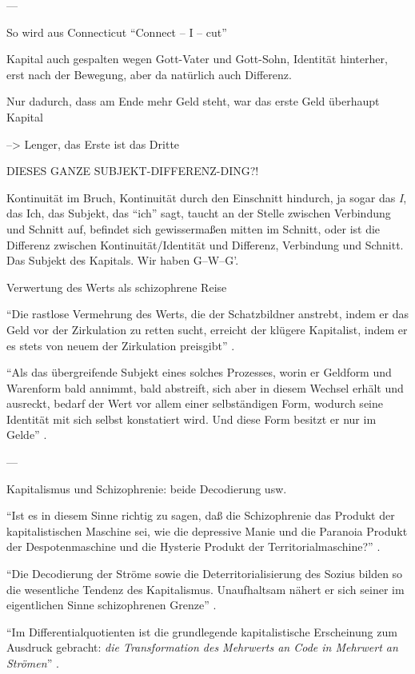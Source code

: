 \documentclass[12pt,
               DIV13,
               paper=a4,
               twoside=false,
               onehalfspacing,
               bibliography=totoc,
               toc=graduated,
               draft,
               ]{scrartcl}
\newcommand{\pc}[2]{\parencite[#1]{#2}}
\newcommand{\gwg}{G--W--G'\xspace}
\begin{document}
---

So wird aus Connecticut "`Connect -- I -- cut"' \pc{48}{ao}

Kapital auch gespalten wegen Gott-Vater und Gott-Sohn, Identität
hinterher, erst nach der Bewegung, aber da natürlich auch Differenz.

Nur dadurch, dass am Ende mehr Geld steht, war das erste Geld
überhaupt Kapital

--> Lenger, das Erste ist das Dritte

DIESES GANZE SUBJEKT-DIFFERENZ-DING?!

Kontinuität im Bruch, Kontinuität durch den Einschnitt hindurch, ja
sogar das \emph{I}, das Ich, das Subjekt, das "`ich"' sagt, taucht an
der Stelle zwischen Verbindung und Schnitt auf, befindet sich
gewissermaßen mitten im Schnitt, oder ist die Differenz zwischen
Kontinuität/Identität und Differenz, Verbindung und Schnitt. Das
Subjekt des Kapitals. Wir haben \gwg.

Verwertung des Werts als schizophrene Reise

"`Die rastlose Vermehrung des Werts, die der Schatzbildner anstrebt,
indem er das Geld vor der Zirkulation zu retten sucht, erreicht der
klügere Kapitalist, indem er es stets von neuem der Zirkulation
preisgibt"' \pc{168}{kap}.

"`Als das übergreifende Subjekt eines solches Prozesses, worin er
Geldform und Warenform bald annimmt, bald abstreift, sich aber in
diesem Wechsel erhält und ausreckt, bedarf der Wert vor allem einer
selbständigen Form, wodurch seine Identität mit sich selbst
konstatiert wird. Und diese Form besitzt er nur im Gelde"'
\pc{169}{kap}.

---

Kapitalismus und Schizophrenie: beide Decodierung usw.

"`Ist es in diesem Sinne richtig zu sagen, daß die Schizophrenie das
Produkt der kapitalistischen Maschine sei, wie die depressive Manie
und die Paranoia Produkt der Despotenmaschine und die Hysterie Produkt
der Territorialmaschine?"' \pc{44}{ao}.

"`Die Decodierung der Ströme sowie die Deterritorialisierung des
Sozius bilden so die wesentliche Tendenz des Kapitalismus.
Unaufhaltsam nähert er sich seiner im eigentlichen Sinne schizophrenen
Grenze"' \pc{44}{ao}.

"`Im Differentialquotienten ist die grundlegende kapitalistische
Erscheinung zum Ausdruck gebracht: \emph{die Transformation des
Mehrwerts an Code in Mehrwert an Strömen}"' \pc{S. 292 f.}{ao}.
\end{document}
